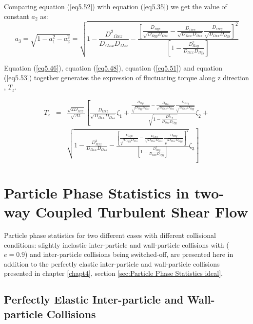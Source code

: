 Comparing equation (\ref{eq5.52}) with equation (\ref{eq5.35}) we get the value of constant $a_2$ as:
\begin{equation}
	\label{eq5.53}
	a_3=\sqrt{1-a_1^2-a_2^2}=\sqrt{1-\frac{{D^2}_{\Omega{xz}}}{D_{\Omega{xx}}D_{\Omega{zz}}}-\frac{[\frac{D_{\Omega{yz}}}{\sqrt{D_{\Omega{yy}}D_{\Omega{zz}}}}-\frac{D_{\Omega{xz}}}{\sqrt{D_{\Omega{xx}}D_{\Omega{zz}}}}\frac{D_{\Omega{xy}}}{\sqrt{D_{\Omega{xx}}D_{\Omega{yy}}}}]^2}{[1-\frac{D_{\Omega{xy}}^2}{D_{\Omega{xx}}D_{\Omega{yy}}}]}}
\end{equation}

Equation (\ref{eq5.46}), equation (\ref{eq5.48}), equation (\ref{eq5.51}) and equation (\ref{eq5.53}) together generates the expression of fluctuating torque along z direction , $T_z$.

\begin{eqnarray} 
	\label{eq5.54}
	T_z & = & \frac{\sqrt{2D_{\Omega{zz}}}}{\sqrt{\Delta t}}\left[\frac{D_{\Omega{xz}}}{\sqrt{D_{\Omega{xx}}D_{\Omega{zz}}}}\zeta_1+{\frac{\frac{D_{\Omega{yz}}}{\sqrt{D_{\Omega{yy}}D_{\Omega{zz}}}}-\frac{D_{\Omega{xz}}}{\sqrt{D_{\Omega{xx}}D_{\Omega{zz}}}}\frac{D_{\Omega{xy}}}{\sqrt{D_{\Omega{xx}}D_{\Omega{yy}}}}}{\sqrt{1-\frac{D_{\Omega{xy}}^2}{D_{\Omega{xx}}D_{\Omega{yy}}}}}}\zeta_2+ \right. \nonumber \\
	&& \mbox{}\left.{\sqrt{1-\frac{D_{\Omega{xz}}^2}{D_{\Omega{xx}}D_{\Omega{zz}}}-\frac{\left[\frac{D_{\Omega{yz}}}{\sqrt{D_{\Omega{yy}}D_{\Omega{zz}}}}-\frac{D_{\Omega{xz}}}{\sqrt{D_{\Omega{xx}}D_{\Omega{zz}}}}\frac{D_{\Omega{xy}}}{\sqrt{D_{\Omega{xx}}D_{\Omega{yy}}}}\right]^2}{\left[1-\frac{D_{\Omega{xy}}^2}{D_{\Omega{xx}}D_{\Omega{yy}}} \right]}}}\zeta_3 \right]                                                               
\end{eqnarray}
\clearpage
\section{Particle Phase Statistics in two-way Coupled Turbulent Shear Flow}
\label{sec:Particle Phase Statistics}
Particle phase statistics for two different cases with different collisional conditions: slightly inelastic inter-particle and wall-particle collisions with ($e=0.9$) and inter-particle collisions being switched-off, are presented here in addition to the perfectly elastic inter-particle and wall-particle collisions presented in chapter \ref{chapt4}, section \ref{sec:Particle Phase Statistics ideal}. 
\subsection{Perfectly Elastic Inter-particle and Wall-particle Collisions}

